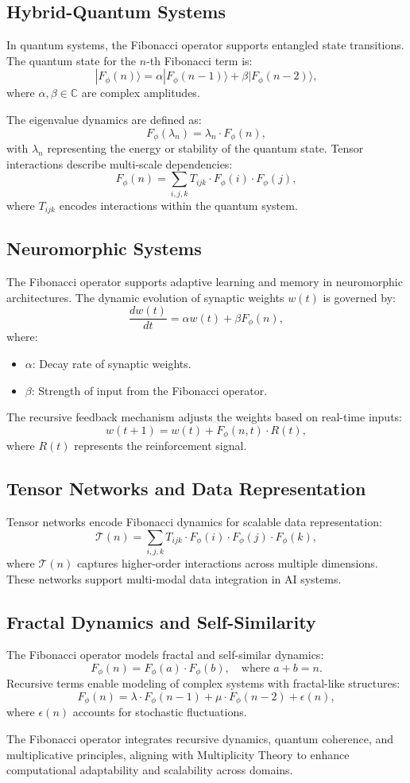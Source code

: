 \documentclass{article}
\theoremstyle{plain}
\begin{document}
\subsection{Hybrid-Quantum Systems}
In quantum systems, the Fibonacci operator supports entangled state transitions. The quantum state for the \( n \)-th Fibonacci term is:
\[
|F_\phi(n)\rangle = \alpha |F_\phi(n-1)\rangle + \beta |F_\phi(n-2)\rangle,
\]
where \( \alpha, \beta \in \mathbb{C} \) are complex amplitudes.

The eigenvalue dynamics are defined as:
\[
F_\phi(\lambda_n) = \lambda_n \cdot F_\phi(n),
\]
with \( \lambda_n \) representing the energy or stability of the quantum state. Tensor interactions describe multi-scale dependencies:
\[
F_\phi(n) = \sum_{i,j,k} T_{ijk} \cdot F_\phi(i) \cdot F_\phi(j),
\]
where \( T_{ijk} \) encodes interactions within the quantum system.

\subsection{Neuromorphic Systems}
The Fibonacci operator supports adaptive learning and memory in neuromorphic architectures. The dynamic evolution of synaptic weights \( w(t) \) is governed by:
\[
\frac{dw(t)}{dt} = \alpha w(t) + \beta F_\phi(n),
\]
where:
\begin{itemize}
    \item \( \alpha \): Decay rate of synaptic weights.
    \item \( \beta \): Strength of input from the Fibonacci operator.
\end{itemize}

The recursive feedback mechanism adjusts the weights based on real-time inputs:
\[
w(t+1) = w(t) + F_\phi(n, t) \cdot R(t),
\]
where \( R(t) \) represents the reinforcement signal.

\subsection{Tensor Networks and Data Representation}
Tensor networks encode Fibonacci dynamics for scalable data representation:
\[
\mathcal{T}(n) = \sum_{i,j,k} T_{ijk} \cdot F_\phi(i) \cdot F_\phi(j) \cdot F_\phi(k),
\]
where \( \mathcal{T}(n) \) captures higher-order interactions across multiple dimensions. These networks support multi-modal data integration in AI systems.

\subsection{Fractal Dynamics and Self-Similarity}
The Fibonacci operator models fractal and self-similar dynamics:
\[
F_\phi(n) = F_\phi(a) \cdot F_\phi(b), \quad \text{where } a+b = n.
\]
Recursive terms enable modeling of complex systems with fractal-like structures:
\[
F_\phi(n) = \lambda \cdot F_\phi(n-1) + \mu \cdot F_\phi(n-2) + \epsilon(n),
\]
where \( \epsilon(n) \) accounts for stochastic fluctuations.

The Fibonacci operator integrates recursive dynamics, quantum coherence, and multiplicative principles, aligning with Multiplicity Theory to enhance computational adaptability and scalability across domains.

\nocite{*}


\end{document}
